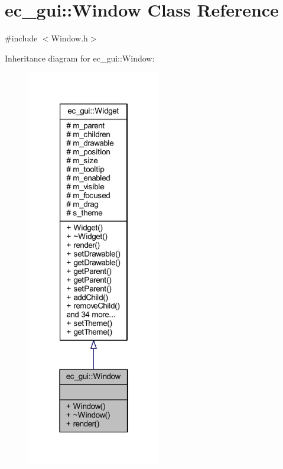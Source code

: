 \hypertarget{classec__gui_1_1_window}{}\section{ec\+\_\+gui\+:\+:Window Class Reference}
\label{classec__gui_1_1_window}


{\ttfamily \#include $<$Window.\+h$>$}



Inheritance diagram for ec\+\_\+gui\+:\+:Window\+:\nopagebreak
\begin{figure}[H]
\begin{center}
\leavevmode
\includegraphics[width=166pt]{classec__gui_1_1_window__inherit__graph}
\end{center}
\end{figure}


